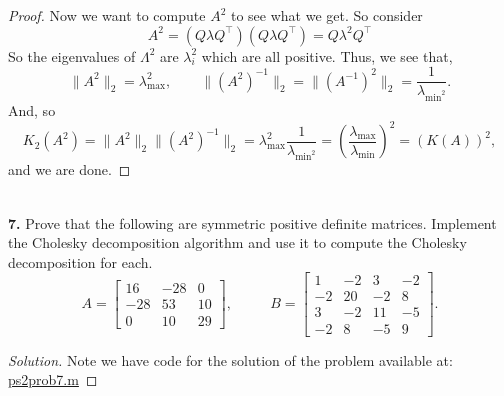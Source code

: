\documentclass[12pt]{amsart}
\newenvironment{solution}
{\begin{proof}[Solution]}
{\end{proof}}
\begin{document}
\begin{onehalfspace}
\begin{proof}
            Now we want to compute $A^2$ to see what we get.
            So consider
            \begin{displaymath}
                A^2 = (Q\lambda Q^\top)(Q\lambda Q^\top) = Q\lambda^2 Q^\top
            \end{displaymath}
            So the eigenvalues of $\Lambda^2$ are $\lambda_i^2$ which are all positive.
            Thus, we see that,
            \begin{displaymath}
                \|A^2\|_2 = \lambda_{\text{max}}^2,\qquad \|(A^2)^{-1}\|_2 = \|(A^{-1})^2\|_2 = \frac{1}{\lambda_{\text{min}^2}}.
            \end{displaymath}
            And, so
            \begin{displaymath}
                K_2(A^2) = \|A^2\|_2\|(A^2)^{-1}\|_2 = \lambda_{\text{max}}^2\frac{1}{\lambda_{\text{min}^2}}
                =\left(\frac{\lambda_{\text{max}}}{\lambda_{\text{min}}}\right)^2 = (K(A))^2,
            \end{displaymath}
            and we are done.
        \end{proof}

        \quad\\
        \noindent\textbf{7.} Prove that the following are symmetric positive definite matrices.
        Implement the Cholesky decomposition algorithm and use it to compute the Cholesky decomposition for each.
        \begin{displaymath}
            A = \left[\begin{matrix}
                          16 & -28 & 0\\
                          -28 & 53 & 10 \\
                          0 & 10 & 29
            \end{matrix}\right],
            \quad\text{ }\quad
            B = \left[\begin{matrix}
                          1 & -2 & 3 & -2\\
                          -2 & 20 & -2 & 8\\
                          3 & -2 & 11 & -5\\
                          -2 & 8 & -5 & 9
            \end{matrix}\right].
        \end{displaymath}
        \begin{solution}
            Note we have code for the solution of the problem available at:
            \href{https://github.com/chtompki/MathSpring2026/tree/main/NumericalAnalysis/ProblemSet2/ps2prob7.m}{ps2prob7.m}


\end{solution}
\end{onehalfspace}
\end{document}
